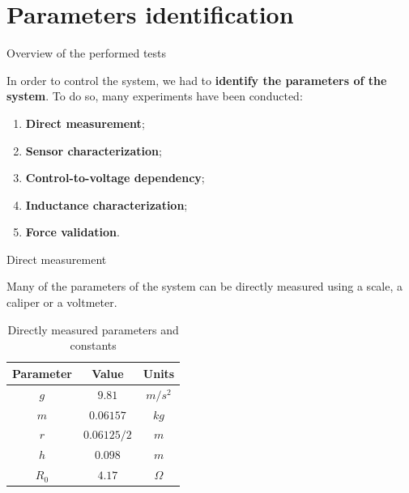 \section{Parameters identification}

\begin{frame}{Overview of the performed tests}

    In order to control the system, we had to \textbf{identify the parameters of the system}.
    To do so, many experiments have been conducted:

    \begin{enumerate}
        \item \textbf{Direct measurement};
        \item \textbf{Sensor characterization};
        \item \textbf{Control-to-voltage dependency};
        \item \textbf{Inductance characterization};
        \item \textbf{Force validation}.
    \end{enumerate}

\end{frame}



\begin{frame}{Direct measurement}

    Many of the parameters of the system can be directly measured using a scale, a caliper or a voltmeter.

    \begin{table}[H]

        \centering
        \begin{tabular}{|c|c|c|}
            \hline
            \textbf{Parameter} & \textbf{Value} & \textbf{Units} \\
            \hline
            $g$                & $9.81$         & $m/s^2$        \\
            $m$                & $0.06157$      & $kg$           \\
            $r$                & $0.06125/2$    & $m$            \\
            $h$                & $0.098$        & $m$            \\
            $R_{0}$            & $4.17$         & $\Omega$       \\
            \hline
        \end{tabular}

        \caption{Directly measured parameters and constants}
        \label{tab:directly_measured_parameters}

    \end{table}

\end{frame}



